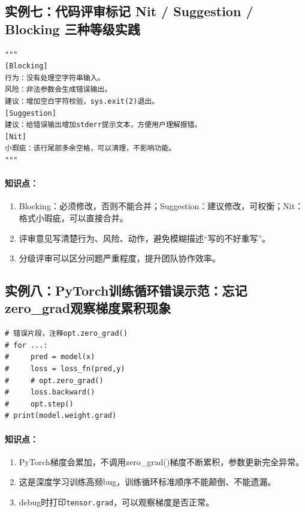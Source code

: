 \documentclass{article}
\begin{document}
\subsection*{实例七：代码评审标记 Nit / Suggestion / Blocking 三种等级实践}
\begin{lstlisting}
"""
[Blocking]
行为：没有处理空字符串输入。
风险：非法参数会生成错误输出。
建议：增加空白字符校验，sys.exit(2)退出。
[Suggestion]
建议：给错误输出增加stderr提示文本，方便用户理解报错。
[Nit]
小瑕疵：该行尾部多余空格，可以清理，不影响功能。
"""
\end{lstlisting}
\paragraph{知识点：}
\begin{enumerate}
\item Blocking：必须修改，否则不能合并；Suggestion：建议修改，可权衡；Nit：格式小瑕疵，可以直接合并。
\item 评审意见写清楚行为、风险、动作，避免模糊描述“写的不好重写”。
\item 分级评审可以区分问题严重程度，提升团队协作效率。
\end{enumerate}
\subsection*{实例八：PyTorch训练循环错误示范：忘记zero\_grad观察梯度累积现象}
\begin{lstlisting}
# 错误片段，注释opt.zero_grad()
# for ...:
#     pred = model(x)
#     loss = loss_fn(pred,y)
#     # opt.zero_grad()
#     loss.backward()
#     opt.step()
# print(model.weight.grad)
\end{lstlisting}
\paragraph{知识点：}
\begin{enumerate}
\item PyTorch梯度会累加，不调用zero\_grad()梯度不断累积，参数更新完全异常。
\item 这是深度学习训练高频bug，训练循环标准顺序不能颠倒、不能遗漏。
\item debug时打印\texttt{tensor.grad}，可以观察梯度是否正常。
\end{enumerate}
\end{document}

